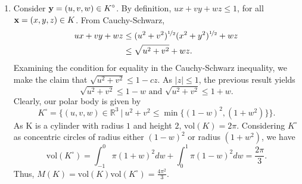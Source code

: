 \documentclass[a4paper,11pt]{article}
\newcommand{\ds}{\displaystyle}
\begin{document}
{{\begin{enumerate}[leftmargin=*]
		\item Consider $\ds{{\bf{y}} = (u,v,w) \in K^{\circ}}$. By definition, $\ds{ux+vy+wz \leq 1}$, for all $\ds{{\bf{x}} = (x,y,z) \in K}$. From Cauchy-Schwarz,
			\begin{align*}
				ux+vy+wz & \leq (u^2+v^2)^{\nicefrac{1}{2}}(x^2+y^2)^{\nicefrac{1}{2}} +wz\\
						 & \leq \sqrt{u^2 + v^2} + wz.
			\end{align*}
			Examining the condition for equality in the Cauchy-Schwarz inequality, we make the claim that $\ds{\sqrt{u^2+v^2} \leq 1 - cz}$. As $\ds{|z| \leq 1}$, the previous result yields $$\sqrt{u^2+v^2} \leq 1 - w \text{ and } \sqrt{u^2+v^2} \leq 1 + w.$$ Clearly, our polar body is given by $$K^{\circ} = \{(u,v,w) \in \mathbb{R}^3 \:|\: u^2 + v^2 \leq \min\{(1-w)^2, (1+w^2)\}\}.$$ As K is a cylinder with radius $\ds{1}$ and height $\ds{2}$, $\ds{\text{vol}(K) = 2\pi}$. Considering $\ds{K^{\circ}}$ as concentric circles of radius either $\ds{(1-w)^2}$ or radius $\ds{(1+w^2)}$, we have $$\text{vol}(K^{\circ}) = \int_{-1}^0 \pi(1+w)^2 dw + \int_0^1 \pi(1-w)^2 dw = \frac{2\pi}{3}.$$ Thus, $\ds{M(K) = \text{vol}(K)\text{vol}(K^{\circ}) = \frac{4\pi^2}{3}}$.


\end{enumerate}}}
\end{document}
